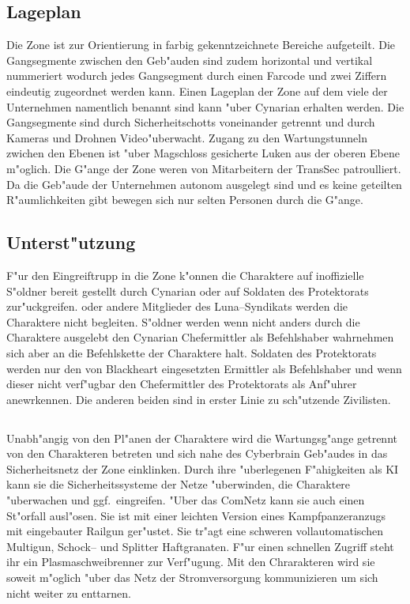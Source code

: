 \subsection{Lageplan} 
Die Zone ist zur Orientierung in farbig gekenntzeichnete Bereiche aufgeteilt. Die Gangsegmente zwischen den Geb"auden sind zudem horizontal und vertikal nummeriert wodurch jedes Gangsegment durch einen Farcode und zwei Ziffern eindeutig zugeordnet werden kann. Einen Lageplan der Zone auf dem viele der Unternehmen namentlich benannt sind kann "uber Cynarian erhalten werden. Die Gangsegmente sind durch Sicherheitschotts voneinander getrennt und durch Kameras und Drohnen Video"uberwacht. Zugang zu den Wartungstunneln zwichen den Ebenen ist "uber Magschloss gesicherte Luken aus der oberen Ebene m"oglich. Die G"ange der Zone weren von Mitarbeitern der TransSec patroulliert. Da die Geb"aude der Unternehmen autonom ausgelegt sind und es keine geteilten R"aumlichkeiten gibt bewegen sich nur selten Personen durch die G"ange.

\subsection{Unterst"utzung} 
F"ur den Eingreiftrupp in die Zone k"onnen die Charaktere auf inoffizielle S"oldner bereit gestellt durch Cynarian oder auf Soldaten des Protektorats zur"uckgreifen. \xl{} oder andere Mitglieder des Luna--Syndikats werden die Charaktere nicht begleiten. S"oldner werden wenn nicht anders durch die Charaktere ausgelebt den Cynarian Chefermittler als Befehlshaber wahrnehmen sich aber an die Befehlskette der Charaktere halt. Soldaten des Protektorats werden nur den von Blackheart eingesetzten Ermittler als Befehlshaber und wenn dieser nicht verf"ugbar den Chefermittler des Protektorats als Anf"uhrer anewrkennen. Die anderen beiden sind in erster Linie zu sch"utzende Zivilisten.

\subsection{\xl} 
Unabh"angig von den Pl"anen der Charaktere wird \xl{} die Wartungsg"ange getrennt von den Charakteren betreten und sich nahe des Cyberbrain Geb"audes in das Sicherheitsnetz der Zone einklinken. Durch ihre "uberlegenen F"ahigkeiten als KI kann sie die Sicherheitssysteme der Netze "uberwinden, die Charaktere "uberwachen und ggf.~eingreifen. "Uber das ComNetz kann sie auch einen St"orfall ausl"osen. Sie ist mit einer leichten Version eines Kampfpanzeranzugs mit eingebauter Railgun ger"ustet. Sie tr"agt eine schweren vollautomatischen Multigun, Schock-- und Splitter Haftgranaten. F"ur einen schnellen Zugriff steht ihr ein Plasmaschwei\3brenner zur Verf"ugung. Mit den Chrarakteren wird sie soweit m"oglich "uber das Netz der Stromversorgung kommunizieren um sich nicht weiter zu enttarnen.

